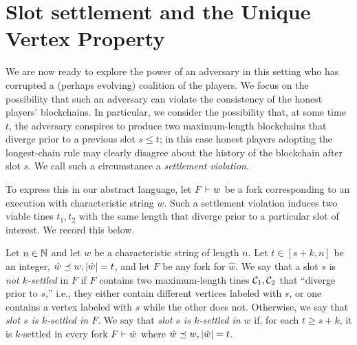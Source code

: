 

\section[Slot Settlement and UVP]{Slot settlement and the Unique Vertex Property}\label{sec:model-settlement}
  
  We are now ready to explore the power of an adversary in this
  setting who has corrupted a (perhaps evolving) coalition of the
  players. We focus on the possibility that such an adversary can
  violate the consistency of the honest players'
  blockchains. In particular, we consider the possibility that, at
  some time $t$, the adversary conspires to produce two maximum-length blockchains 
  that diverge prior to a previous slot $s \leq t$; in
  this case honest players adopting the longest-chain rule may clearly
  disagree about the history of the blockchain after slot $s$. We call
  such a circumstance a \emph{settlement violation}.

  To express this in our abstract language, let $F \vdash w$ be a fork
  corresponding to an execution with characteristic string $w$. Such a
  settlement violation induces two viable tines $t_1, t_2$ with the
  same length that diverge prior to a particular slot of interest. We
  record this below.
    
  \begin{definition}\label{def:settlement-mh}
    Let $n \in \mathbb{N}$ and let $w$ be a characteristic string of length $n$. 
    Let $t \in [s + k, n]$ be an integer, $\hat{w} \preceq w, |\hat{w}| = t$, and 
    let $F$ be any fork for $\hat{w}$. 
    We say that a slot $s$ is \emph{not $k$-settled} in $F$ if 
    $F$ contains two maximum-length tines $\mathcal{C}_1, \mathcal{C}_2$ 
    that ``diverge prior to $s$,'' i.e., they either
    contain different vertices labeled with $s$, or one contains a
    vertex labeled with $s$ while the other does not. 
    Otherwise, we say that \emph{slot $s$ is $k$-settled in $F$}. 
    We say that \emph{slot $s$ is $k$-settled in $w$} if, 
    for each $t \geq s+k$, 
    it is $k$-settled in every fork $F \vdash \hat{w}$ where $\hat{w} \preceq w, |\hat{w}| = t$.
  \end{definition}




